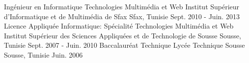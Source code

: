 \begin{cventries}
  \cventry
    {Ingénieur en Informatique Technologies Multimédia et Web }
    {Institut Supérieur d’Informatique et de Multimédia de Sfax}
    {Sfax, Tunisie}
    {Sept. 2010 - Juin. 2013}
    {
    }
  \cventry
    {Licence Appliquée Informatique: Spécialité Technologies Multimédia et Web}
    {Institut Supérieur des Sciences Appliquées et de Technologie de Sousse}
    {Sousse, Tunisie}
    {Sept. 2007 - Juin. 2010}
    {
    }    
  \cventry
    {Baccalauréat Technique}
    {Lycée Technique Sousse}
    {Sousse, Tunisie}
    {Juin. 2006}
    {
    }      
\end{cventries}
